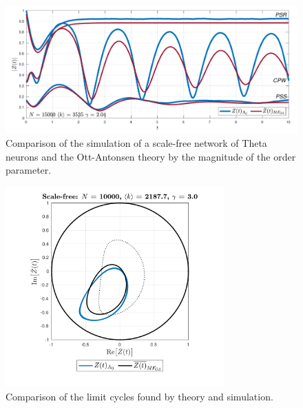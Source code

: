 \begin{figure}[H]
\centering
\includegraphics[width = \textwidth]{../Figures/InspectMeanFieldScaleFree.pdf}
\caption{Comparison of the simulation of a scale-free network of Theta neurons and the Ott-Antonsen theory by the magnitude of the order parameter.}
\label{fig:InspectMeanFieldScaleFree}
\end{figure}

\begin{figure}[H]
\centering
\includegraphics[width = 0.75\textwidth]{../Figures/PhaseSpace/InspectMeanFieldScaleFreePhaseSpace.pdf}
\caption{Comparison of the limit cycles found by theory and simulation.}
\label{fig:InspectMeanFieldScaleFreePhaseSpace}
\end{figure}


